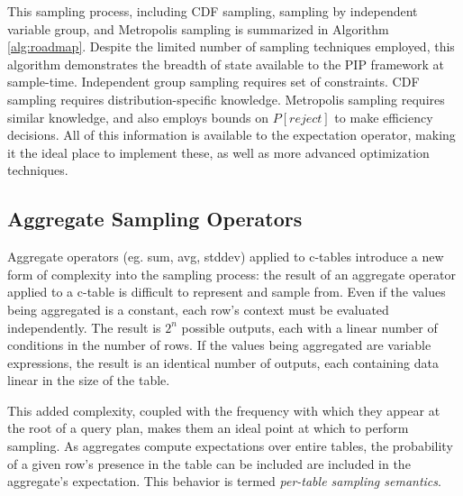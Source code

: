This sampling process, including CDF sampling, sampling by independent variable group, and Metropolis sampling is summarized in Algorithm \ref{alg:roadmap}.  Despite the limited number of sampling techniques employed, this algorithm demonstrates the breadth of state available to the PIP framework at sample-time.  Independent group sampling requires set of constraints.  CDF sampling requires distribution-specific knowledge.  Metropolis sampling requires similar knowledge, and also employs bounds on $P[reject]$ to make efficiency decisions.  All of this information is available to the expectation operator, making it the ideal place to implement these, as well as more advanced optimization techniques.

%


\subsection{Aggregate Sampling Operators}
Aggregate operators (eg. sum, avg, stddev) applied to c-tables introduce a new form of complexity into the sampling process: the result of an aggregate operator applied to a c-table is difficult to represent and sample from.  Even if the values being aggregated is a constant, each row's context must be evaluated independently.  The result is $2^n$ possible outputs, each with a linear number of conditions in the number of rows.  If the values being aggregated are variable expressions, the result is an identical number of outputs, each containing data linear in the size of the table.  

This added complexity, coupled with the frequency with which they appear at the root of a query plan, makes them an ideal point at which to perform sampling.  As aggregates compute expectations over entire tables, the probability of a given row's presence in the table can be included are included in the aggregate's expectation.  This behavior is termed \textit{per-table sampling semantics}.

